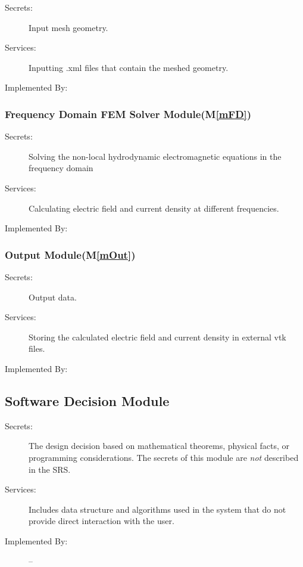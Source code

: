 \documentclass[12pt, titlepage]{article}
\newcommand{\mref}[1]{M\ref{#1}}
\begin{document}
	\begin{description} \item[Secrets:]Input mesh geometry.
		\item[Services:]Inputting .xml files that contain the meshed geometry.
		\item[Implemented By:] \progname{} \end{description}
	
	
	
	\subsubsection{Frequency Domain FEM Solver Module(\mref{mFD})}

	\begin{description} \item[Secrets:]Solving the non-local hydrodynamic
	electromagnetic equations in the frequency domain \item[Services:]Calculating
	electric field and current density at different frequencies. \item[Implemented
	By:] \progname{} \end{description}
	
	
	
	\subsubsection{Output Module(\mref{mOut})}
	
	\begin{description} \item[Secrets:]Output data. \item[Services:]Storing the
		calculated electric field and current density in external vtk files.
		\item[Implemented By:] \progname{} \end{description}
	
	
	\subsection{Software Decision Module}
	
	\begin{description} \item[Secrets:] The design decision based on mathematical
		theorems, physical facts, or programming considerations. The secrets of this
		module are \emph{not} described in the SRS. \item[Services:] Includes data
		structure and algorithms used in the system that do not provide direct
		interaction with the user. %
		\item[Implemented By:] -- \end{description}
	
\end{document}
